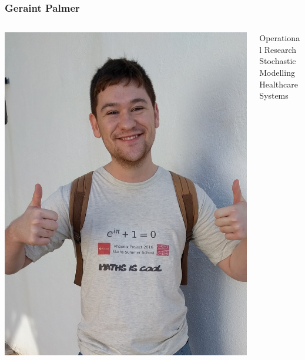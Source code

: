 \documentclass{beamer}
\begin{document}
\begin{frame}
  \frametitle{Geraint Palmer}
  \begin{columns}
    \begin{column}{0.5\textwidth}
      \begin{center}
        \includegraphics[width=\textwidth]{GeraintPhoto}
      \end{center}
    \end{column}
    \begin{column}{0.5\textwidth}
      \begin{center}
        Operational Research\\
        \vspace{12mm}
        Stochastic Modelling\\
        \vspace{12mm}
        Healthcare Systems\\
      \end{center}
    \end{column}
  \end{columns}
\end{frame}
\end{document}
